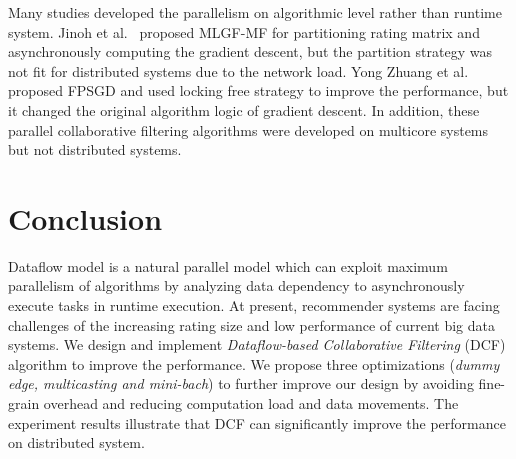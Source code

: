 \documentclass{llncs}
\begin{document}
Many studies developed the parallelism on algorithmic level rather than runtime system. Jinoh et al.~\cite{sgdKdd2015} proposed MLGF-MF for partitioning rating matrix and asynchronously computing the gradient descent, but the partition strategy was not fit for distributed systems due to the network load. Yong Zhuang et al.~\cite{sgdFast2015} proposed FPSGD and used locking free strategy to improve the performance, but it changed the original algorithm logic of gradient descent. In addition, these parallel collaborative filtering algorithms were developed on multicore systems but not distributed systems.
\vspace{-15pt}
\section{Conclusion}
\label{sec:conclusion}
\vspace{-5pt}
Dataflow model is a natural parallel model which can exploit maximum
parallelism of algorithms by analyzing data dependency to asynchronously
execute tasks in runtime execution. At present, recommender
systems are facing challenges of the increasing rating size and low performance of current big data systems. We design and implement {\it Dataflow-based Collaborative Filtering} (DCF) algorithm to improve the performance. We propose three optimizations ({\it dummy edge, multicasting and mini-bach}) to further improve our design by avoiding fine-grain overhead and reducing computation load and data movements. The experiment results illustrate that DCF can significantly improve the performance on distributed system.

\vspace{-10pt}


\vspace{-20pt}
\end{document}
